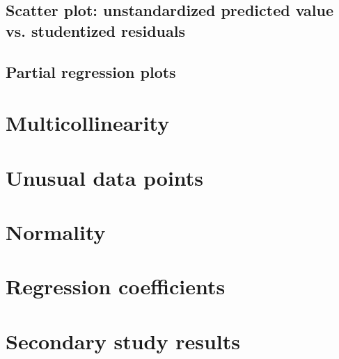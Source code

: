 \documentclass{sigchi}
\begin{document}
\subsection{Scatter plot: unstandardized predicted value vs. studentized residuals}
\hfill \break

\clearpage

\subsection{Partial regression plots}
\hfill \break


\clearpage

\section{Multicollinearity} %
\label{app:multicollinearity}
\hfill \break

\clearpage

\section{Unusual data points} %
\label{sec:unusual_data_points}
\hfill \break

\clearpage

\section{Normality} %
\label{app:normality}
\hfill \break

\clearpage

\section{Regression coefficients} %
\label{sec:regression_coefficients}
\hfill \break

\clearpage

\section{Secondary study results} %
\label{sec:secondary_study_results}
\hfill \break

\end{document}
